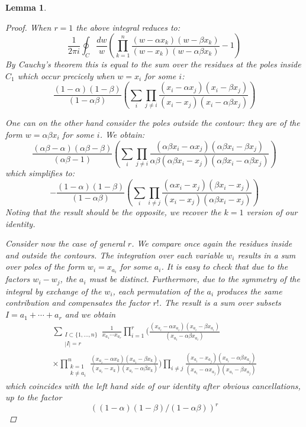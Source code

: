 \documentclass[12pt,dvips]{amsart}
\newtheorem{lemma}{Lemma}[section]
\begin{document}
\begin{lemma}
\begin{proof}
\medskip

When $r=1$ the above integral reduces to:
\[
\frac{1}{2 \pi i} \oint_{C} \frac{dw}{w}
\left(
 \prod_{k = 1}^n \frac{(w - \alpha x_k)(w - \beta x_k)}{(w - x_k)(w - \alpha \beta x_k)}
-1\right)
\]
By Cauchy's theorem this is equal to the sum over the residues at the poles inside $C_1$ which occur precicely when $w = x_i$ for some $i$:
\[
\frac{(1 - \alpha)(1 - \beta)}{(1 - \alpha \beta)}\left ( \sum_i \prod_{j \neq i} \frac{(x_i - \alpha x_j)(x_i - \beta x_j)}{(x_i - x_j)(x_i - \alpha \beta x_j)} \right )
\]

\medskip
One can on the other hand consider the poles outside the contour: they are of the form $w = \alpha \beta x_i$ for some $i$. We obtain:
\[
\frac{(\alpha \beta - \alpha)(\alpha \beta - \beta)}{(\alpha \beta - 1)} 
\left ( \sum_i \prod_{j \neq i} \frac{(\alpha \beta x_i - \alpha x_j)(\alpha \beta x_i - \beta x_j)}{\alpha \beta (\alpha \beta x_i - x_j)(\alpha \beta x_i - \alpha \beta x_j)}\right )
\]
which simplifies to:
\[
- \frac{(1 - \alpha)(1 - \beta)}{(1 - \alpha \beta)} 
\left ( \sum_i \prod_{i \neq j} \frac{(\alpha x_i - x_j)(\beta x_i - x_j)}{(x_i - x_j)(\alpha \beta x_i - x_j)}\right )
\]
Noting that the result should be the opposite, we recover the $k=1$ version of our identity. 

\medskip

Consider now the case of general $r$. We compare once again the residues inside and outside the contours. The integration over each variable $w_i$ 
results in a sum over poles of the form $w_i=x_{a_i}$ for some $a_i$.
It is easy to check that due to the factors $w_i-w_j$, the $a_i$ must be
distinct. Furthermore, due to the symmetry of the integral by exchange of
the $w_i$, each permutation of the $a_i$ produces the same contribution
and compensates the factor $r!$. The result is a sum over subsets
$I=a_1+\cdots+a_r$ and we obtain
\begin{multline*}
\sum_{\substack{I\subset\{1,\ldots,n\}\\|I|=r}}
\frac{1}{x_{a_1}\cdots x_{a_r}}
\prod_{i=1}^r
\bigg( \frac{(x_{a_i}-\alpha x_{a_i})(x_{a_i}-\beta x_{a_i})}{(x_{a_i}-\alpha\beta x_{a_i})}
\\
\times\prod_{\substack{k=1\\k\ne a_i}}^n \frac{(x_{a_i}-\alpha x_k)(x_{a_i}-\beta x_k)}{(x_{a_i}-x_k)(x_{a_i}-\alpha\beta x_k)}
\bigg)
\prod_{i\ne j} \frac{(x_{a_i}-x_{a_j})(x_{a_i}-\alpha\beta x_{a_j})}{(x_{a_i}-\alpha x_{a_j})(x_{a_i}-\beta x_{a_j})}
\end{multline*}
which coincides with the left hand side of our identity after obvious cancellations, up to the factor
\[
((1-\alpha)(1-\beta)/(1-\alpha\beta))^r
\]


\end{proof}
\end{lemma}
\end{document}
